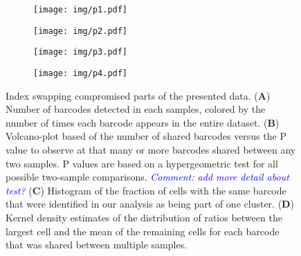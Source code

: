 \documentclass{article}
\newcommand{\comment}[1]{\textit{\textcolor{blue}{Comment: #1}}}
\begin{document}
\begin{figure}
    \begin{subfigure}[c]{0.5\textwidth}
	\texttt{[image: img/p1.pdf]}
    \caption{}
    \end{subfigure}
    \begin{subfigure}[c]{0.5\textwidth}
	\texttt{[image: img/p2.pdf]}
    \caption{}
    \end{subfigure}
    \begin{subfigure}[c]{0.5\textwidth}
	\texttt{[image: img/p3.pdf]}
    \caption{}
    \end{subfigure}
    \begin{subfigure}[c]{0.5\textwidth}
	\texttt{[image: img/p4.pdf]}
    \caption{}
    \end{subfigure}
    \caption{Index swapping compromised parts of the presented data.
	(\textbf{A}) Number of barcodes detected in each samples, colored by the number of times each barcode appears in the entire dataset.
	(\textbf{B}) Volcano-plot based of the number of shared barcodes versus the P value to observe at that many or more barcodes shared between any two samples.
	P values are based on a hypergeometric test for all possible two-sample comparisons. \comment{add more detail about test?}
	(\textbf{C}) Histogram of the fraction of cells with the same barcode that were identified in our analysis as being part of one cluster.
	(\textbf{D}) Kernel density estimates of the distribution of ratios between the largest cell and the mean of the remaining cells for each barcode that was shared between multiple samples.
    }
    \label{F2}
\end{figure}
\end{document}
